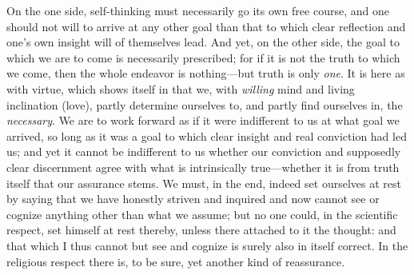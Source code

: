 \documentclass[12pt,a4paper]{book}
\begin{document}
On the one side, self-thinking must necessarily go its own free course, and one should not will to
arrive at any other goal than that to which clear reflection and one's own insight will of
themselves lead. And yet, on the other side, the goal to which we are to come is necessarily
prescribed; for if it is not the truth to which we come, then the whole endeavor is nothing---but
truth is only \emph{one}. It is here as with virtue, which shows itself in that we, with
\emph{willing} mind and living inclination (love), partly determine ourselves to, and partly find
ourselves in, the \emph{necessary}. We are to work forward as if it were indifferent to us at what
goal we arrived, so long as it was a goal to which clear insight and real conviction had led us;
and yet it cannot be indifferent to us whether our conviction and supposedly clear discernment
agree with what is intrinsically true---whether it is from truth itself that our assurance stems.
We must, in the end, indeed set ourselves at rest by saying that we have honestly striven and
inquired and now cannot see or cognize anything other than what we assume; but no one could, in
the scientific respect, set himself at rest thereby, unless there attached to it the thought: and
that which I thus cannot but see and cognize is surely also in itself correct. In the religious
respect there is, to be sure, yet another kind of reassurance.
\end{document}
